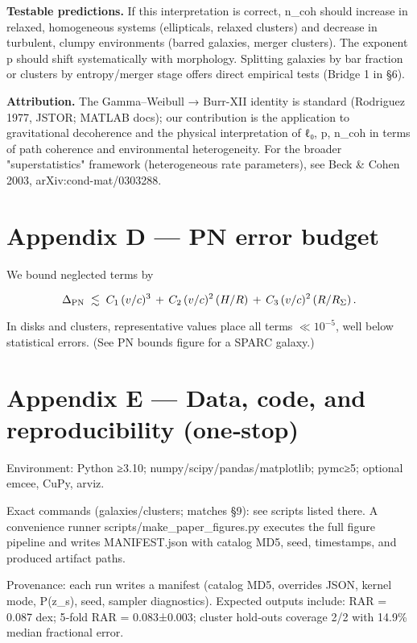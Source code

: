 \documentclass[11pt,a4paper]{article}
\begin{document}
\textbf{Testable predictions.} If this interpretation is correct, n\_coh should increase in relaxed, homogeneous systems (ellipticals, relaxed clusters) and decrease in turbulent, clumpy environments (barred galaxies, merger clusters). The exponent p should shift systematically with morphology. Splitting galaxies by bar fraction or clusters by entropy/merger stage offers direct empirical tests (Bridge 1 in §6).


\textbf{Attribution.} The Gamma–Weibull → Burr-XII identity is standard (Rodriguez 1977, JSTOR; MATLAB docs); our contribution is the application to gravitational decoherence and the physical interpretation of {ℓ₀, p, n\_coh} in terms of path coherence and environmental heterogeneity. For the broader "superstatistics" framework (heterogeneous rate parameters), see Beck \& Cohen 2003, arXiv:cond-mat/0303288.


\section{Appendix D — PN error budget}


We bound neglected terms by


\begin{equation}
\Delta_{\rm PN} \;\lesssim\; C_1\,(v/c)^3 \, + \, C_2\,(v/c)^2\,(H/R) \, + \, C_3\,(v/c)^2\,(R/R_\Sigma)\,.
\end{equation}


In disks and clusters, representative values place all terms $\ll10^{-5}$, well below statistical errors. (See PN bounds figure for a SPARC galaxy.)


\section{Appendix E — Data, code, and reproducibility (one‑stop)}


Environment: Python ≥3.10; numpy/scipy/pandas/matplotlib; pymc≥5; optional emcee, CuPy, arviz.


Exact commands (galaxies/clusters; matches §9): see scripts listed there. A convenience runner scripts/make\_paper\_figures.py executes the full figure pipeline and writes MANIFEST.json with catalog MD5, seed, timestamps, and produced artifact paths.


Provenance: each run writes a manifest (catalog MD5, overrides JSON, kernel mode, P(z\_s), seed, sampler diagnostics). Expected outputs include: RAR = 0.087 dex; 5‑fold RAR = 0.083±0.003; cluster hold‑outs coverage 2/2 with 14.9\% median fractional error.
\end{document}
